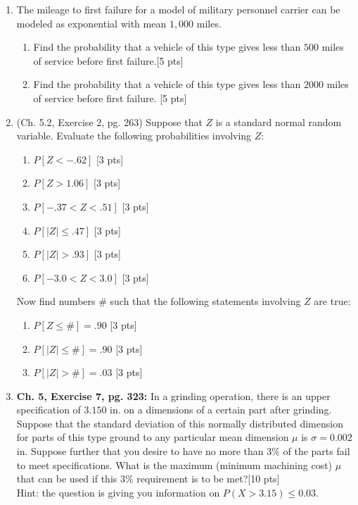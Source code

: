 \documentclass[11pt]{article}\usepackage[]{graphicx}\usepackage[]{color}
\begin{document}
\begin{enumerate}
	
  \item The mileage to first failure for a model of military personnel carrier can be modeled as exponential with mean $1,000$ miles.
  
          \begin{enumerate}
                \item Find the probability that a vehicle of this type gives less than $500$ miles of service before first failure.[5 pts] 
                
                \item Find the probability that a vehicle of this type gives less than $2000$ miles of service before first failure. [5 pts]
                
          \end{enumerate}
          
  \item (Ch. 5.2, Exercise 2, pg. 263) Suppose that $Z$ is a standard normal random variable. Evaluate the following probabilities involving $Z$: 
  
          \begin{enumerate}
                \item $P[Z < -.62]$ [3 pts]
                \item $P[Z > 1.06]$ [3 pts]
                \item $P[-.37 < Z < .51]$ [3 pts]
                \item $P[|Z| \le .47]$ [3 pts]
                \item $P[|Z| > .93]$ [3 pts]
                \item $P[-3.0 < Z < 3.0]$ [3 pts]
          \end{enumerate}      
    
    Now find numbers $\#$ such that the following statements involving $Z$ are true:
          \begin{enumerate}
                    \item $P[Z \le \#] = .90$ [3 pts]
                    \item  $P[|Z| \le \#] = .90$ [3 pts]
                    \item $P[|Z| > \#] = .03$ [3 pts]
          \end{enumerate}          

	
    \item \textbf{Ch. 5, Exercise 7, pg. 323:} In a grinding operation, there is an upper specification of $3.150$ in. on a dimensions of a certain part after grinding. Suppose that the standard deviation of this normally distributed dimension for parts of this type ground to any particular mean dimension $\mu$ is $\sigma = 0.002$ in. Suppose further that you desire to have no more than $3\%$ of the parts fail to meet specifications. What is the maximum (minimum machining cost) $\mu$ that can be used if this $3$\% requirement is to be met?[10 pts]\\
    Hint: the question is giving you information on $P(X> 3.15)\leq 0.03$.
    

\end{enumerate}
\end{document}
